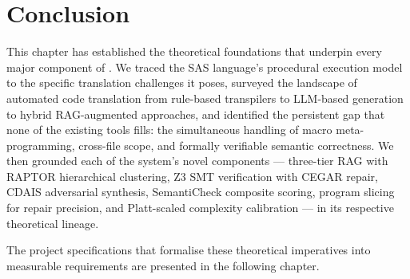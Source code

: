 \section{Conclusion}
\label{sec:ch2-conclusion}

This chapter has established the theoretical foundations that underpin every
major component of \codara{}. We traced the SAS language's procedural execution
model to the specific translation challenges it poses, surveyed the landscape
of automated code translation from rule-based transpilers to \ac{LLM}-based
generation to hybrid \ac{RAG}-augmented approaches, and identified the
persistent gap that none of the existing tools fills: the simultaneous handling
of macro meta-programming, cross-file scope, and formally verifiable semantic
correctness. We then grounded each of the system's novel components --- three-tier
\ac{RAG} with \ac{RAPTOR} hierarchical clustering, Z3 \ac{SMT} verification
with \ac{CEGAR} repair, \ac{CDAIS} adversarial synthesis, SemantiCheck composite
scoring, program slicing for repair precision, and Platt-scaled complexity
calibration --- in its respective theoretical lineage.

The project specifications that formalise these theoretical imperatives into
measurable requirements are presented in the following chapter.

